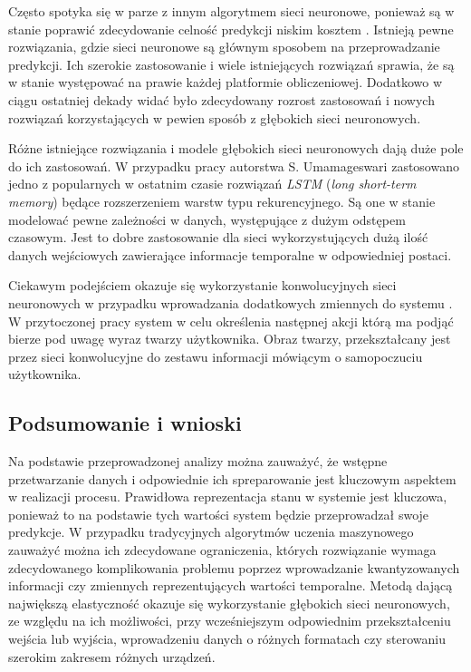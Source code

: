 Często spotyka się w parze z innym algorytmem sieci neuronowe, ponieważ są w stanie poprawić zdecydowanie celność predykcji niskim kosztem \cite{episode_discovery_1}. Istnieją pewne rozwiązania, gdzie sieci neuronowe są głównym sposobem na przeprowadzanie predykcji. Ich szerokie zastosowanie i wiele istniejących rozwiązań sprawia, że są w stanie występować na prawie każdej platformie obliczeniowej. Dodatkowo w ciągu ostatniej dekady widać było zdecydowany rozrost zastosowań i nowych rozwiązań korzystających w pewien sposób z głębokich sieci neuronowych.

Różne istniejące rozwiązania i modele głębokich sieci neuronowych dają duże pole do ich zastosowań. W przypadku pracy autorstwa S. Umamageswari \cite{neural_1} zastosowano jedno z popularnych w ostatnim czasie rozwiązań \textit{LSTM} (\textit{long short-term memory}) będące rozszerzeniem warstw typu rekurencyjnego. Są one w stanie modelować pewne zależności w danych, występujące z dużym odstępem czasowym. Jest to dobre zastosowanie dla sieci wykorzystujących dużą ilość danych wejściowych zawierające informacje temporalne w odpowiedniej postaci.

Ciekawym podejściem okazuje się wykorzystanie konwolucyjnych sieci neuronowych w przypadku wprowadzania dodatkowych zmiennych do systemu \cite{conv_1}. W przytoczonej pracy system w celu określenia następnej akcji którą ma podjąć bierze pod uwagę wyraz twarzy użytkownika. Obraz twarzy, przekształcany jest przez sieci konwolucyjne do zestawu informacji mówiącym o samopoczuciu użytkownika.

\subsection{Podsumowanie i wnioski}
Na podstawie przeprowadzonej analizy można zauważyć, że wstępne przetwarzanie danych i odpowiednie ich spreparowanie jest kluczowym aspektem w realizacji procesu. Prawidłowa reprezentacja stanu w systemie jest kluczowa, ponieważ to na podstawie tych wartości system będzie przeprowadzał swoje predykcje. W przypadku tradycyjnych algorytmów uczenia maszynowego zauważyć można ich zdecydowane ograniczenia, których rozwiązanie wymaga zdecydowanego komplikowania problemu poprzez wprowadzanie kwantyzowanych informacji czy zmiennych reprezentujących wartości temporalne. Metodą dającą największą elastyczność okazuje się wykorzystanie głębokich sieci neuronowych, ze względu na ich możliwości, przy wcześniejszym odpowiednim przekształceniu wejścia lub wyjścia, wprowadzeniu danych o różnych formatach czy sterowaniu szerokim zakresem różnych urządzeń.

